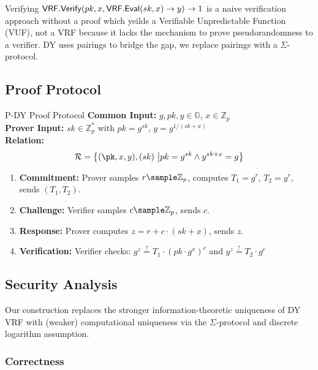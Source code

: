 \begin{remark}
    Verifying $\mathsf{VRF.Verify}(pk, x, \mathsf{VRF.Eval}(sk, x) \to y) \to 1$ is a naive verification approach without a proof which yeilds a Verifiable Unpredictable Function (VUF), not a VRF because it lacks the mechanism to prove pseudorandomness to a verifier. DY uses pairings to bridge the gap, we replace pairings with a $\Sigma$-protocol. 
\end{remark}

\subsection{Proof Protocol}
\begin{protocol}{P-DY Proof Protocol}{}\label{protocol-pdy-protocol1}
\textbf{Common Input:} $g, pk, y \in \mathbb{G}$, $x \in \mathbb{Z}_p$ \\
\textbf{Prover Input:} $sk \in \mathbb{Z}_p^*$ with $pk = g^{sk}$, $y = g^{1/(sk + x)}$ \\
\textbf{Relation: }
\[
\mathcal{R} = \left\{ (\pk, x, y), (sk) \ \middle| pk = g^{sk} \land y^{sk + x} = g \right\}
\]
\begin{enumerate}
    \item \textbf{Commitment:} Prover samples $r \sample  \mathbb{Z}_p$, computes $T_1 = g^r$, $T_2 = y^r$, sends $(T_1, T_2)$.
    \item \textbf{Challenge:} Verifier samples $c \sample  \mathbb{Z}_p$, sends $c$.
    \item \textbf{Response:} Prover computes $z = r + c \cdot (sk + x)$, sends $z$.
    \item \textbf{Verification:} Verifier checks: $g^z \stackrel{?}{=} T_1 \cdot (pk \cdot g^x)^c$ and $y^z \stackrel{?}{=} T_2 \cdot g^c$
\end{enumerate}
\end{protocol}

\subsection{Security Analysis}

Our construction replaces the stronger information-theoretic uniqueness of DY VRF with (weaker) computational uniqueness via the $\Sigma$-protocol and discrete logarithm assumption.


\subsubsection{Correctness}

